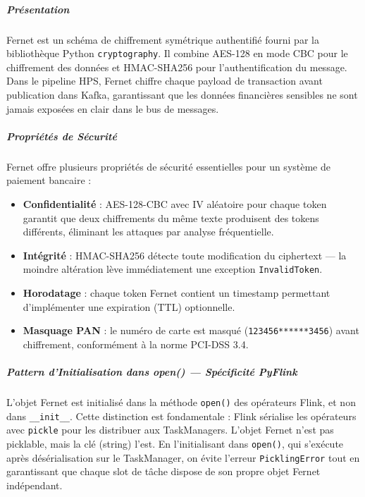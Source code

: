 \subparagraph{Présentation}
\vspace{0.1cm}
Fernet est un schéma de chiffrement symétrique authentifié fourni par la bibliothèque Python \texttt{cryptography}. Il combine AES-128 en mode CBC pour le chiffrement des données et HMAC-SHA256 pour l'authentification du message. Dans le pipeline HPS, Fernet chiffre chaque payload de transaction avant publication dans Kafka, garantissant que les données financières sensibles ne sont jamais exposées en clair dans le bus de messages.

\vspace{0.3cm}
\subparagraph{Propriétés de Sécurité}
\vspace{0.1cm}
Fernet offre plusieurs propriétés de sécurité essentielles pour un système de paiement bancaire :
\begin{itemize}
    \item \textbf{Confidentialité} : AES-128-CBC avec IV aléatoire pour chaque token garantit que deux chiffrements du même texte produisent des tokens différents, éliminant les attaques par analyse fréquentielle.
    \item \textbf{Intégrité} : HMAC-SHA256 détecte toute modification du ciphertext --- la moindre altération lève immédiatement une exception \texttt{InvalidToken}.
    \item \textbf{Horodatage} : chaque token Fernet contient un timestamp permettant d'implémenter une expiration (TTL) optionnelle.
    \item \textbf{Masquage PAN} : le numéro de carte est masqué (\texttt{123456******3456}) avant chiffrement, conformément à la norme PCI-DSS 3.4.
\end{itemize}

\vspace{0.3cm}
\subparagraph{Pattern d'Initialisation dans open() --- Spécificité PyFlink}
\vspace{0.1cm}
L'objet Fernet est initialisé dans la méthode \texttt{open()} des opérateurs Flink, et non dans \texttt{\_\_init\_\_}. Cette distinction est fondamentale : Flink sérialise les opérateurs avec \texttt{pickle} pour les distribuer aux TaskManagers. L'objet Fernet n'est pas picklable, mais la clé (string) l'est. En l'initialisant dans \texttt{open()}, qui s'exécute après désérialisation sur le TaskManager, on évite l'erreur \texttt{PicklingError} tout en garantissant que chaque slot de tâche dispose de son propre objet Fernet indépendant.

\newpage

